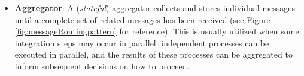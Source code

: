 \begin{itemize}
    \item \textbf{Aggregator}: A (\emph{stateful}) aggregator collects and stores individual messages until a complete set of related messages has been received (see Figure \ref{fig:messageRoutingpattern} for reference). This is usually utilized when some integration steps may occur in parallel: independent processes can be executed in parallel, and the results of these processes can be aggregated to inform subsequent decisions on how to proceed.
\end{itemize}




